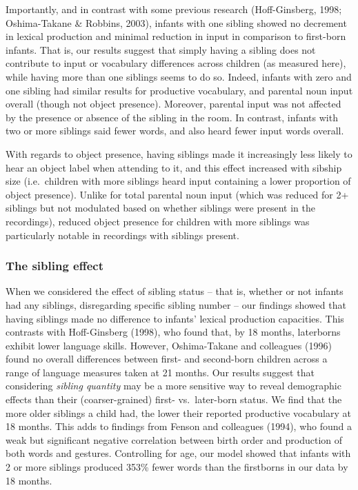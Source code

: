 \documentclass[
  man,mask,floatsintext]{apa6}
\begin{document}
Importantly, and in contrast with some previous research (Hoff-Ginsberg, 1998; Oshima-Takane \& Robbins, 2003), infants with one sibling showed no decrement in lexical production and minimal reduction in input in comparison to first-born infants. That is, our results suggest that simply having a sibling does not contribute to input or vocabulary differences across children (as measured here), while having more than one siblings seems to do so. Indeed, infants with zero and one sibling had similar results for productive vocabulary, and parental noun input overall (though not object presence). Moreover, parental input was not affected by the presence or absence of the sibling in the room. In contrast, infants with two or more siblings said fewer words, and also heard fewer input words overall.

With regards to object presence, having siblings made it increasingly less likely to hear an object label when attending to it, and this effect increased with sibship size (i.e.~children with more siblings heard input containing a lower proportion of object presence). Unlike for total parental noun input (which was reduced for 2+ siblings but not modulated based on whether siblings were present in the recordings), reduced object presence for children with more siblings was particularly notable in recordings with siblings present.

\hypertarget{the-sibling-effect}{%
\subsubsection{The sibling effect}\label{the-sibling-effect}}

When we considered the effect of sibling status -- that is, whether or not infants had any siblings, disregarding specific sibling number -- our findings showed that having siblings made no difference to infants' lexical production capacities. This contrasts with Hoff-Ginsberg (1998), who found that, by 18 months, laterborns exhibit lower language skills. However, Oshima-Takane and colleagues (1996) found no overall differences between first- and second-born children across a range of language measures taken at 21 months. Our results suggest that considering \emph{sibling quantity} may be a more sensitive way to reveal demographic effects than their (coarser-grained) first- vs.~later-born status. We find that the more older siblings a child had, the lower their reported productive vocabulary at 18 months. This adds to findings from Fenson and colleagues (1994), who found a weak but significant negative correlation between birth order and production of both words and gestures. Controlling for age, our model showed that infants with 2 or more siblings produced 353\% fewer words than the firstborns in our data by 18 months.
\end{document}
